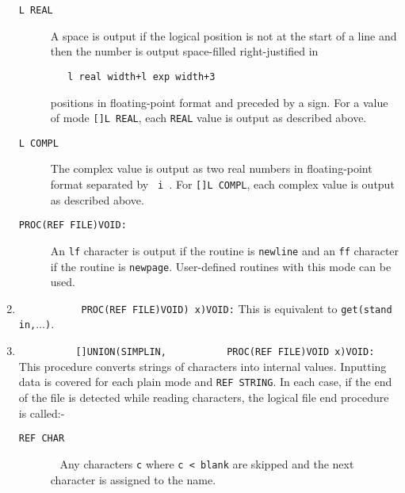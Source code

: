 \begin{enumerate}
\begin{description}
\item[\texttt{L REAL}] A space is output if the logical position is not at the
start of a line and then the number is output space-filled
right-justified in
\begin{verbatim}
   l real width+l exp width+3
\end{verbatim}
\noindent
positions in floating-point format and preceded by a sign. For a
value of mode \verb|[]L REAL|, each \verb|REAL| value is output as
described above.
\item[\texttt{L COMPL}] The complex value is output as two real numbers in
floating-point format separated by \verb*| i |. For \verb|[]L COMPL|,
each complex value is output as described above.
\item[\texttt{PROC(REF FILE)VOID:}]
An \verb|lf| character is output if the routine is \texttt{newline}
and an \verb|ff| character if the routine is \texttt{newpage}.
User-defined routines with this mode can be used.
\end{description}
\item {}\newline
\verb|           PROC(REF FILE)VOID) x)VOID:|\newline
This is equivalent to \verb|get(stand in,|$\ldots$\verb|)|.
\item {}\newline
\verb|          []UNION(SIMPLIN,|\newline
\verb|          PROC(REF FILE)VOID x)VOID:|\newline
This procedure converts strings of characters into internal values.
Inputting data is covered for each plain mode and \verb|REF STRING|. In
each case, if the end of the file is detected while reading characters,
the logical file end procedure is called:-
\begin{description}
\item[\texttt{REF CHAR}]\ \newline
Any characters \verb|c| where \verb|c < blank| are
skipped and the next character is assigned to the name.


\end{description}
\end{enumerate}
